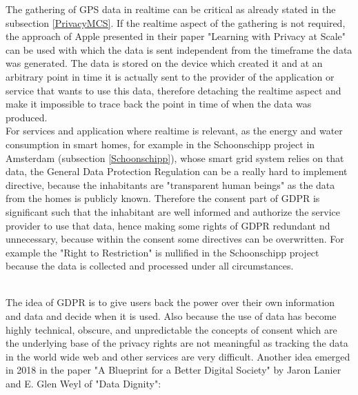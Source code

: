 \documentclass[a4paper,12pt]{report}
\begin{document}
		The gathering of GPS data in realtime can be critical as already stated in the subsection \ref{PrivacyMCS}. If the realtime aspect of the gathering is not required, the approach of Apple presented in their paper "Learning with Privacy at Scale" \cite{PrivacyApple} can be used with which the data is sent independent from the timeframe the data was generated. The data is stored on the device which created it and at an arbitrary point in time it is actually sent to the provider of the application or service that wants to use this data, therefore detaching the realtime aspect and make it impossible to trace back the point in time of when the data was produced. \\
		For services and application where realtime is relevant, as the energy and water consumption in smart homes, for example in the Schoonschipp project in Amsterdam (subsection \ref{Schoonschipp}), whose smart grid system relies on that data, the General Data Protection Regulation can be a really hard to implement directive, because the inhabitants are "transparent human beings" as the data from the homes is publicly known. Therefore the consent part of GDPR is significant such that the inhabitant are well informed and authorize the service provider to use that data, hence making some rights of GDPR redundant nd unnecessary, because within the consent some directives can be overwritten. For example the "Right to Restriction" is nullified in the Schoonschipp project because the data is collected and processed under all circumstances.
	\closesection
	
	\hfill \\
	\noindent The idea of GDPR is to give users back the power over their own information and data and decide when it is used. Also because the use of data has become highly technical, obscure, and unpredictable the concepts of consent which are the underlying base of the privacy rights are not meaningful as tracking the data in the world wide web and other services are very difficult. Another idea emerged in 2018 in the paper "A Blueprint for a Better Digital Society" by Jaron Lanier and E. Glen Weyl of "Data Dignity":
	
\end{document}
